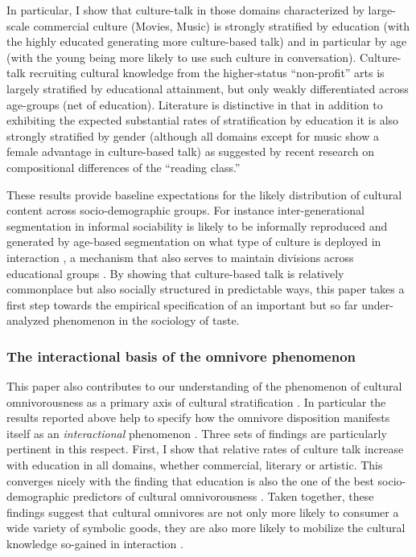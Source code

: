 \documentclass[11pt]{article}
\begin{document}
In particular, I show that culture-talk in those domains characterized by large-scale commercial culture (Movies, Music) is strongly stratified by education (with the highly educated generating more culture-based talk) and in particular by age (with the young being more likely to use such culture in conversation). Culture-talk recruiting cultural knowledge from the higher-status ``non-profit'' arts is largely stratified by educational attainment, but only weakly differentiated across age-groups (net of education).  Literature is distinctive in that in addition to exhibiting the expected substantial rates of stratification by education it is also strongly stratified by gender (although all domains except for music show a female advantage in culture-based talk) as suggested by recent research on compositional differences of the ``reading class.''  

These results provide baseline expectations for the likely distribution of cultural content across socio-demographic groups.  For instance inter-generational segmentation in informal sociability is likely to be informally reproduced and generated by age-based segmentation on what type of culture is deployed in interaction \citep{milner04}, a mechanism that also serves to maintain divisions across educational groups \citep{collins75}.   By showing that culture-based talk is relatively commonplace but also socially structured in predictable ways, this paper takes a first step towards the empirical specification of an important but so far under-analyzed phenomenon in the sociology of taste.  

\subsubsection{The interactional basis of the omnivore phenomenon}
This paper also contributes to our understanding of the phenomenon of cultural omnivorousness as a primary axis of cultural stratification \citep{peterson92, peterson_kern96}.  In particular the results reported above help to specify how the omnivore disposition manifests itself as an \emph{interactional} phenomenon \citep{ollivier08}. Three sets of findings are particularly pertinent in this respect.  First, I show that relative rates of culture talk increase with education in all domains, whether commercial, literary or artistic. This converges nicely with the finding that education is also the one of the best socio-demographic predictors of cultural omnivorousness \citep{warde_etal08, peterson_rossman08, lopez-sintas_katz-gerro05}.   Taken together, these findings suggest that cultural omnivores are not only more likely to consumer a wide variety of symbolic goods, they are also more likely to mobilize the cultural knowledge so-gained in interaction \citep{peterson92, dimaggio96, lizardo06a}. 
\end{document}

